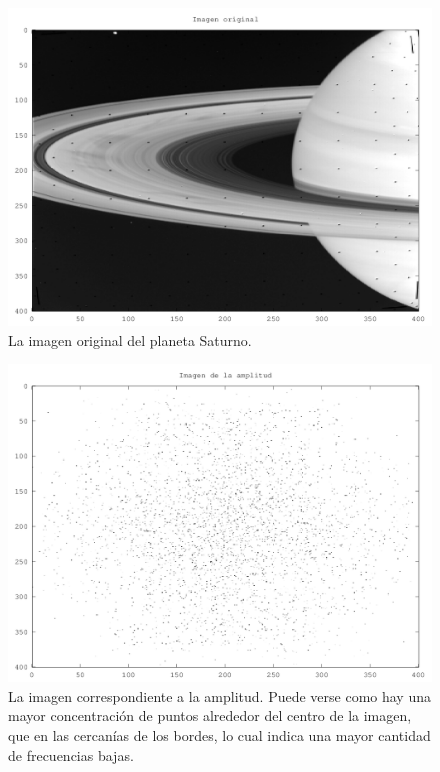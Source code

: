 \documentclass[twocolumn,a4paper,10pt]{article}
\begin{document}
\begin{figure}[H]
        \includegraphics[width=\linewidth]{../images/saturno.png}
        \caption{La imagen original del planeta Saturno.}
        \label{fig:saturno}
\end{figure}

\begin{figure}[H]
        \includegraphics[width=\linewidth]{../images/amplitude.png}
        \caption{La imagen correspondiente a la amplitud. Puede verse como hay una mayor concentraci\'on de puntos alrededor del centro de la imagen, que 
        en las cercan\'ias de los bordes, lo cual indica una mayor cantidad de frecuencias bajas.}
        \label{fig:amplitude}
\end{figure}
\end{document}

